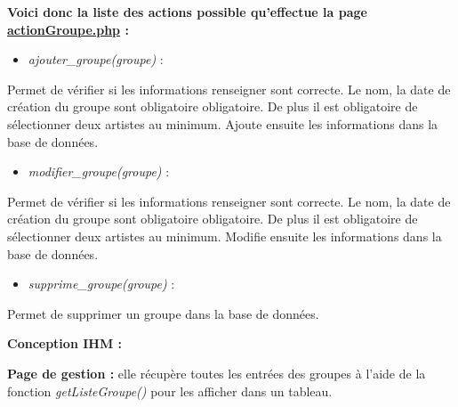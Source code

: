 			\begin{paragraphe}
                \textbf{Voici donc la liste des actions possible qu'effectue la page \underline{actionGroupe.php} :}
            
                \begin{itemize}
                    \item \emph{ajouter\_groupe(groupe)} :
                \end{itemize}
                \begin{paragraphe}
                    Permet de vérifier si les informations renseigner sont correcte. Le nom, la date de création du groupe sont obligatoire obligatoire. De plus il est obligatoire de sélectionner deux artistes au minimum. Ajoute ensuite les informations dans la base de données.
                \end{paragraphe}
                
                \begin{itemize}
                    \item \emph{modifier\_groupe(groupe)} :
                \end{itemize}
                \begin{paragraphe}
                    Permet de vérifier si les informations renseigner sont correcte. Le nom, la date de création du groupe sont obligatoire obligatoire. De plus il est obligatoire de sélectionner deux artistes au minimum. Modifie ensuite les informations dans la base de données.
                \end{paragraphe}
                
                \begin{itemize}
                    \item \emph{supprime\_groupe(groupe)} :
                \end{itemize}
                \begin{paragraphe}
                    Permet de supprimer un groupe dans la base de données.
                \end{paragraphe}
            \end{paragraphe}

			\begin{paragraphe}
				\textbf{Conception IHM :}
			\end{paragraphe}
            
            \begin{paragraphe}
                \textbf{Page de gestion :} elle récupère toutes les entrées des groupes à l'aide de la fonction \emph{getListeGroupe()} pour les afficher dans un tableau.
            \end{paragraphe}

